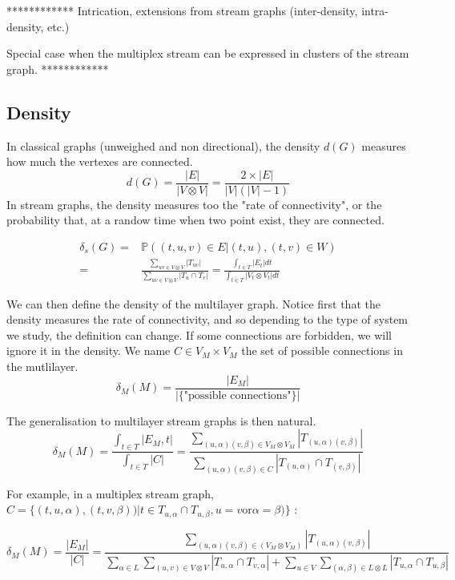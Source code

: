 \documentclass[dvipsnames,a4paper,11pt]{article}
\theoremstyle{definition}
\theoremstyle{remark}
\begin{document}
	************
    Intrication, extensions from stream graphs (inter-density, intra-density, etc.)

    Special case when the multiplex stream can be expressed in clusters of the stream graph.
    ************
    
    
    	
    \subsection{Density}
	In classical graphs (unweighed and non directional), the density $d(G)$ measures how much the vertexes are connected. 
		\[
			d(G) = \frac{|E|}{|V\otimes V|} = \frac{2\times |E|}{|V|(|V|-1)}
		\] 
	In stream graphs, the density measures too the "rate of connectivity", or the probability that, at a randow time when two point exist, they are connected.
	
		\begin{align*}
			\delta_s(G) = & \mathbb{P}((t,u,v)\in E| (t,u),(t,v) \in W) \\
			 =  & \frac{\sum_{uv \in V \otimes V}{|T_{uv}|}}{\sum_{uv \in V\otimes V}{|T_u\cap T_v|}}= \frac{\int_{t\in T}{|E_t|dt}}{\int_{t\in T}{|V_t\otimes V_t|dt}}
		\end{align*}
	
	We can then define the density of the multilayer graph. Notice first that the density measures the rate of connectivity, and so depending to the type of system we study, the definition can change. If some connections are forbidden, we will ignore it in the density. We name $C \in V_M\times V_M$ the set of possible connections in the mutlilayer.
	\[
		\delta_M (M) = \frac{|E_M|}{|\{\text{"possible connections"}\}|}
	\]
	
	The generalisation to multilayer stream graphs is then natural.
	\[
		\delta_M (M) = \frac{\int_{t\in T}|E_M,t|}{\int_{t\in T}|C|} = \frac{\sum_{(u,\alpha)(v,\beta) \in V_M \otimes V_M}|T_{(u,\alpha)(v,\beta)}|}{\sum_{(u,\alpha)(v,\beta) \in C}|T_{(u,\alpha)}\cap T_{(v,\beta)}|}
	\]
	
	For example, in a multiplex stream graph, $C=\{(t,u,\alpha),(t,v,\beta))| t\in T_{u,\alpha} \cap T_{u,\beta}, u=v \text{or} \alpha = \beta)\}$ :
	
	\[
		\delta_M (M) = \frac{|E_M|}{|C|}= \frac{\sum_{(u,\alpha)(v,\beta) \in (V_M \otimes V_M)} |T_{(u,\alpha)(v,\beta)}|}{\sum_{\alpha \in L}\sum_{(u,v) \in V\otimes V}|T_{u,\alpha} \cap T_{v,\alpha}|+ \sum_{u \in V } \sum_{(\alpha,\beta) \in L \otimes L}|T_{u,\alpha}\cap T_{u,\beta}|} 
	\]
		       
\end{document}
